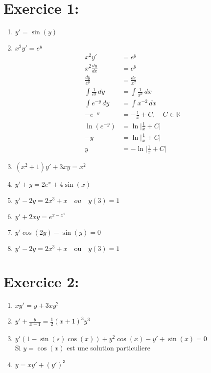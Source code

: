 \documentclass[a4paper,12pt]{article}
\begin{document}
\section*{Exercice 1:}
\begin{enumerate}
	\item $y' = \sin(y)$

	\item $x^2 y' = e^y$ \\
		\begin{align*}
			x^2 y' &= e^y \\
			x^2 \frac{dy}{dx} &= e^y \\
			\frac{dy}{e^y} &= \frac{dx}{x^2} \\
			\int \frac{1}{e^{y}} \, dy &= \int \frac{1}{x^{2}} \, dx \\
			\int e^{-y}\,dy &= \int x^{-2} \, dx \\
			-e^{-y} &= -\frac{1}{x} + C, \quad C \in \mathbb{R} \\
			\ln(e^{-y}) &= \ln \lvert \frac{1}{x} + C \rvert \\
			-y &= \ln \lvert \frac{1}{x} + C \rvert \\
			y &= -\ln \lvert \frac{1}{x} + C \rvert
		\end{align*}


	\item $(x^2 + 1) y' + 3xy = x^2$ \\
	

	\item $y' + y = 2e^x + 4 \sin(x)$

	\item $y' - 2y = 2x^3 + x \quad ou \quad y(3)=1$

	\item $y' + 2xy = e^{x-x^2}$

	\item $y' \cos(2y) - \sin(y) = 0$

	\item $y' - 2y = 2x^3 + x \quad \text{ou} \quad y(3)=1$
\end{enumerate}

\section*{Exercice 2:}
\begin{enumerate}
	\item $xy' = y + 3xy^2$
	\item $y' + \frac{y}{x+1} = \frac{1}{2} (x+1)^3 y^3$
	\item $y' (1 -\sin(s)\cos(x)) + y^2\cos(x) -y' + \sin(x) = 0$ \\ Si $y = \cos(x)$ est une solution particuliere
	\item $y = xy' + (y')^3$
\end{enumerate}
\end{document}
